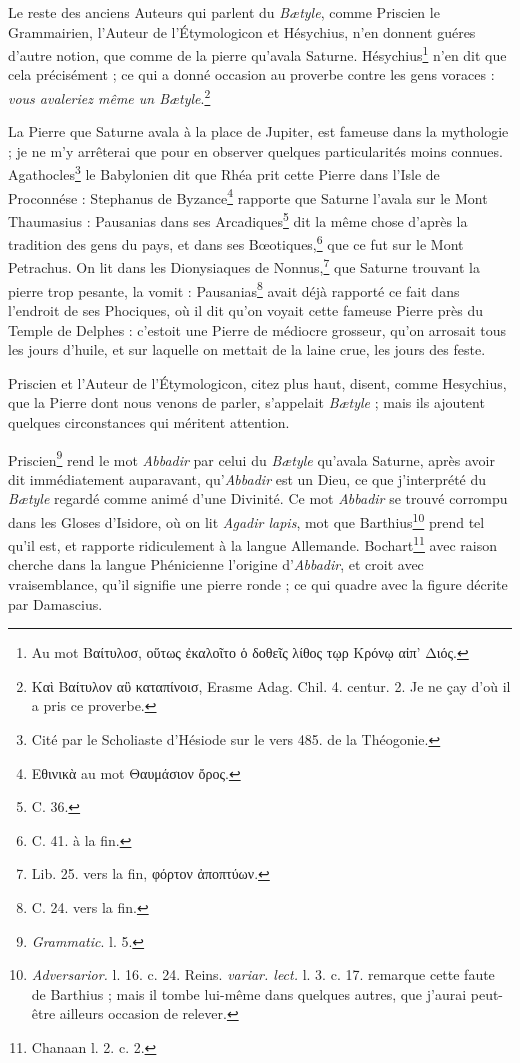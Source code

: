 \documentclass[a4paper, 11pt, oneside, polutonikogreek, french, landscape]{article}
\begin{document}
Le reste des anciens Auteurs qui parlent du \emph{Bætyle}, comme Priscien le Grammairien, l'Auteur de l'Étymologicon et Hésychius, n'en donnent guéres d'autre notion, que comme de la pierre qu'avala Saturne. Hésychius\footnote{Au mot Βαίτυλοσ, οὕτως ἐκαλοῖτο ὁ δοθεῖς λίθος τῳρ Κρόνῳ αἰπ' Διός.} n'en dit que cela précisément ; ce qui a donné occasion au proverbe contre les gens voraces : \emph{vous avaleriez même un Bætyle}.\footnote{Καὶ Βαίτυλον αὒ καταπίνοισ, Erasme Adag. Chil. 4. centur. 2. Je ne çay d'où il a pris ce proverbe.}

La Pierre que Saturne avala à la place de Jupiter, est fameuse dans la mythologie ; je ne m'y arrêterai que pour en observer quelques particularités moins connues. Agathocles\footnote{Cité par le Scholiaste d'Hésiode sur le vers 485. de la Théogonie.} le Babylonien dit que Rhéa prit cette Pierre dans l'Isle de Proconnése : Stephanus de Byzance\footnote{Εθινικὰ au mot Θαυμάσιον ὄρος.} rapporte que Saturne l'avala sur le Mont Thaumasius : Pausanias dans ses Arcadiques\footnote{C. 36.} dit la même chose d'après la tradition des gens du pays, et dans ses Bœotiques,\footnote{C. 41. à la fin.} que ce fut sur le Mont Petrachus. On lit dans les Dionysiaques de Nonnus,\footnote{Lib. 25. vers la fin, φόρτον ἀποπτύων.} que Saturne trouvant la pierre trop pesante, la vomit : Pausanias\footnote{C. 24. vers la fin.} avait déjà rapporté ce fait dans l'endroit de ses Phociques, où il dit qu'on voyait cette fameuse Pierre près du Temple de Delphes : c'estoit une Pierre de médiocre grosseur, qu'on arrosait tous les jours d'huile, et sur laquelle on mettait de la laine crue, les jours des feste.

Priscien et l'Auteur de l'Étymologicon, citez plus haut, disent, comme Hesychius, que la Pierre dont nous venons de parler, s'appelait \emph{Bætyle} ; mais ils ajoutent quelques circonstances qui méritent attention.

Priscien\footnote{\emph{Grammatic}. l. 5.} rend le mot \emph{Abbadir} par celui du \emph{Bætyle} qu'avala Saturne, après avoir dit immédiatement auparavant, qu'\emph{Abbadir} est un Dieu, ce que j'interprété du \emph{Bætyle} regardé comme animé d'une Divinité. Ce mot \emph{Abbadir} se trouvé corrompu dans les Gloses d'Isidore, où on lit \emph{Agadir lapis}, mot que Barthius\footnote{\emph{Adversarior.} l. 16. c. 24. Reins. \emph{variar. lect.} l. 3. c. 17. remarque cette faute de Barthius ; mais il tombe lui-même dans quelques autres, que j'aurai peut-être ailleurs occasion de relever.} prend tel qu'il est, et rapporte ridiculement à la langue Allemande. Bochart\footnote{Chanaan l. 2. c. 2.} avec raison cherche dans la langue Phénicienne l'origine d'\emph{Abbadir}, et croit avec vraisemblance, qu'il signifie une pierre ronde ; ce qui quadre avec la figure décrite par Damascius.
\end{document}
